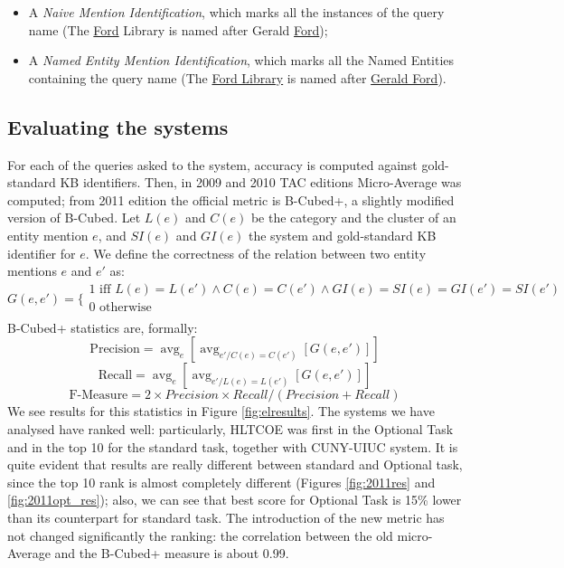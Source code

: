 \documentclass[a4paper,11pt]{report}
\newcommand{\avg}{\operatorname{avg}}
\begin{document}
\begin{itemize}
\item A \emph{Naive Mention Identification}, which marks all the instances of the query name
(The \underline{Ford} Library is named after Gerald \underline{Ford});
\item A \emph{Named Entity Mention Identification}, which marks all the Named Entities containing the query name
(The \underline{Ford Library} is named after \underline{Gerald Ford}).
\end{itemize}
\subsection{Evaluating the systems}
For each of the queries asked to the system, accuracy is computed against gold-standard KB identifiers. Then, in 2009 and 2010 TAC editions Micro-Average was computed; from 2011 edition the official metric is B-Cubed+, a slightly modified version of B-Cubed.
Let $L(e)$ and $C(e)$ be the category and the cluster of an entity mention $e$, and $SI(e)$ and $GI(e)$ the system and gold-standard KB identifier for $e$. We define the correctness of the relation between two entity mentions $e$ and $e'$ as:
$$G(e,e') =
\bigg \{
\begin{array}{l}
1 \text{ iff } L(e) = L(e') \land C(e) = C(e') \land GI(e) = SI(e) = GI(e') = SI(e') \\
0 \text{ otherwise}\\
\end{array}
$$
B-Cubed+ statistics are, formally:
$$
\text{Precision} = \avg_e [\avg_{e'/C(e)=C(e')} [G(e,e')]]
$$
$$
\text{Recall} = \avg_e [\avg_{e'/L(e)=L(e')} [G(e,e')]]
$$
$$
\text{F-Measure} = 2\times Precision \times Recall / (Precision + Recall)
$$
We see results for this statistics in Figure \ref{fig:elresults}. The systems we have analysed  have ranked well: particularly, HLTCOE was first in the Optional Task and in the top 10 for the standard task, together with CUNY-UIUC system. It is quite evident that results are really different between standard and Optional task, since the top 10 rank is almost completely different (Figures \ref{fig:2011res} and \ref{fig:2011opt_res}); also, we can see that best score for Optional Task is 15\% lower than its counterpart for standard task. The introduction of the new metric has not changed significantly the ranking: the correlation between the old micro-Average and the B-Cubed+ measure is about 0.99.
\end{document}

